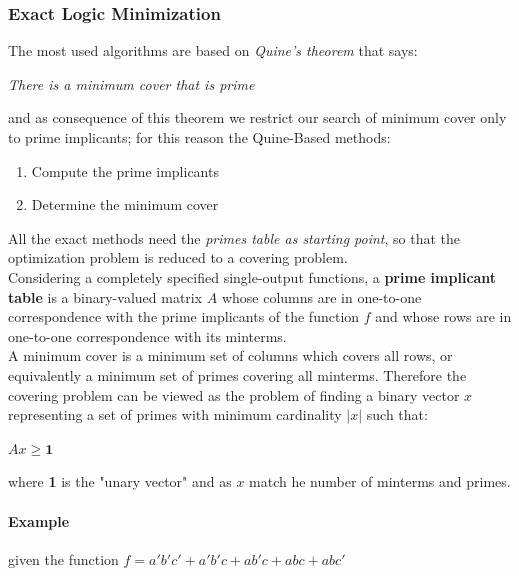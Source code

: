 \subsubsection{Exact Logic Minimization}
The most used algorithms are based on \textit{Quine's theorem} that says:
\begin{center}
	\textit{There is a minimum cover that is prime}\\
\end{center}
and as consequence of this theorem we restrict our search of minimum cover only to prime implicants; for this reason the Quine-Based methods:
\begin{enumerate}
	\item Compute the prime implicants
	\item Determine the minimum cover
\end{enumerate} 
All the exact methods need the\textit{ primes table as starting point}, so that the optimization problem is reduced to a covering problem.\\
Considering a completely specified single-output functions, a \textbf{prime implicant table} is a binary-valued matrix $A$ whose columns are in one-to-one correspondence with the prime implicants of the function $f$ and whose rows are in one-to-one correspondence with its minterms.\\ 
A minimum cover is a minimum set of columns which covers all rows, or equivalently a minimum set of primes covering all minterms. Therefore the covering problem can be viewed as the problem of finding a binary vector $x$ representing a set of primes with minimum cardinality $|x|$ such that:
\begin{center}
	$Ax \geqslant \textbf{1}$
\end{center}
where \textbf{1} is the "unary vector" and as $x$ match he number of minterms and primes.

\paragraph{Example} given the function $ f= a'b'c' + a'b'c + ab'c + abc + abc' $

